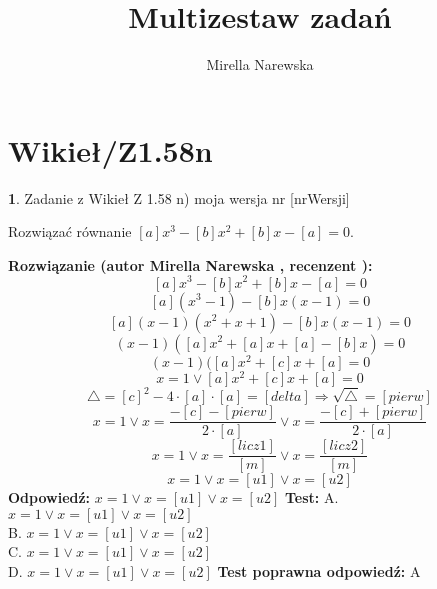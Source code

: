 \documentclass[12pt, a4paper]{article}
\title{Multizestaw zadań}
\author{Mirella Narewska}
\date{}
\theoremstyle{definition} %
\newtheorem{zad}{}
\newcommand{\kategoria}[1]{\section{#1}} %
\newcommand{\zadStart}[1]{\begin{zad}#1\newline} %
\newcommand{\zadStop}{\end{zad}}   %
\newcommand{\rozwStart}[2]{\noindent \textbf{Rozwiązanie (autor #1 , recenzent #2): }\newline} %
\newcommand{\odpStart}{\noindent \textbf{Odpowiedź:}\newline}    %
\newcommand{\odpStop}{\newline}                                             %
\newcommand{\testStart}{\noindent \textbf{Test:}\newline} %
\newcommand{\testStop}{\newline} %
\newcommand{\kluczStart}{\noindent \textbf{Test poprawna odpowiedź:}\newline} %
\newcommand{\kluczStop}{\newline} %
\begin{document}
\maketitle


\kategoria{Wikieł/Z1.58n}
\zadStart{Zadanie z Wikieł Z 1.58 n) moja wersja nr [nrWersji]}

Rozwiązać równanie $[a]x^3-[b]x^2+[b]x-[a]=0$.
\zadStop
\rozwStart{Mirella Narewska}{}
$$[a]x^3-[b]x^2+[b]x-[a]=0$$
$$[a](x^3-1)-[b]x(x-1)=0$$
$$[a](x-1)(x^2+x+1)-[b]x(x-1)=0$$
$$(x-1)([a]x^2+[a]x+[a]-[b]x)=0$$
$$(x-1)([a]x^2+[c]x+[a]=0$$
$$x=1 \vee [a]x^2+[c]x+[a]=0$$
$$\triangle=[c]^2-4\cdot [a] \cdot [a]=[delta] \Rightarrow \sqrt{\triangle}=[pierw]$$
$$x=1 \vee x=\frac{-[c]-[pierw]}{2\cdot[a]} \vee x=\frac{-[c]+[pierw]}{2\cdot[a]}$$
$$x=1 \vee x=\frac{[licz1]}{[m]} \vee x=\frac{[licz2]}{[m]}$$
$$x=1 \vee x=[u1] \vee x=[u2]$$
\odpStart
$x=1 \vee x=[u1] \vee x=[u2]$
\odpStop
\testStart
A. $x=1 \vee x=[u1] \vee x=[u2]$ \\
B. $x=1 \vee x=[u1] \vee x=[u2]$ \\
C. $x=1 \vee x=[u1] \vee x=[u2]$ \\
D. $x=1 \vee x=[u1] \vee x=[u2]$ 
\testStop
\kluczStart
A
\kluczStop
\end{document}
